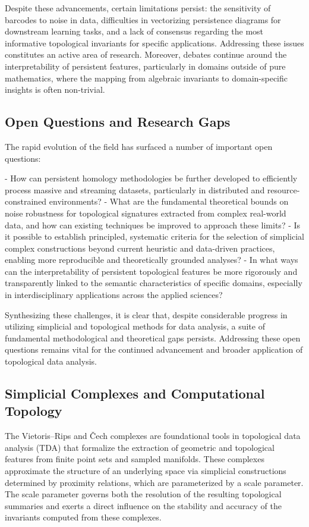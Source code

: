 \documentclass[sigconf]{acmart}
\begin{document}
Despite these advancements, certain limitations persist: the sensitivity of barcodes to noise in data, difficulties in vectorizing persistence diagrams for downstream learning tasks, and a lack of consensus regarding the most informative topological invariants for specific applications. Addressing these issues constitutes an active area of research. Moreover, debates continue around the interpretability of persistent features, particularly in domains outside of pure mathematics, where the mapping from algebraic invariants to domain-specific insights is often non-trivial.

\subsection{Open Questions and Research Gaps}

The rapid evolution of the field has surfaced a number of important open questions:

- How can persistent homology methodologies be further developed to efficiently process massive and streaming datasets, particularly in distributed and resource-constrained environments?
- What are the fundamental theoretical bounds on noise robustness for topological signatures extracted from complex real-world data, and how can existing techniques be improved to approach these limits?
- Is it possible to establish principled, systematic criteria for the selection of simplicial complex constructions beyond current heuristic and data-driven practices, enabling more reproducible and theoretically grounded analyses?
- In what ways can the interpretability of persistent topological features be more rigorously and transparently linked to the semantic characteristics of specific domains, especially in interdisciplinary applications across the applied sciences?

Synthesizing these challenges, it is clear that, despite considerable progress in utilizing simplicial and topological methods for data analysis, a suite of fundamental methodological and theoretical gaps persists. Addressing these open questions remains vital for the continued advancement and broader application of topological data analysis.

\subsection{Simplicial Complexes and Computational Topology}

The Vietoris–Rips and Čech complexes are foundational tools in topological data analysis (TDA) that formalize the extraction of geometric and topological features from finite point sets and sampled manifolds. These complexes approximate the structure of an underlying space via simplicial constructions determined by proximity relations, which are parameterized by a scale parameter. The scale parameter governs both the resolution of the resulting topological summaries and exerts a direct influence on the stability and accuracy of the invariants computed from these complexes.
\end{document}

